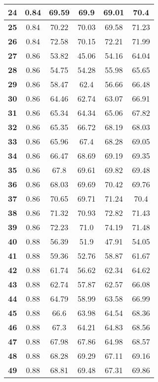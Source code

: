 \begin{longtable}{|c|c|c|c|c|c|}
\textbf{24} & 0.84 & 69.59 & 69.9 & 69.01 & 70.4 \\ \hline 
\textbf{25} & 0.84 & 70.22 & 70.03 & 69.58 & 71.23 \\ \hline 
\textbf{26} & 0.84 & 72.58 & 70.15 & 72.21 & 71.99 \\ \hline 
\textbf{27} & 0.86 & 53.82 & 45.06 & 54.16 & 64.04 \\ \hline 
\textbf{28} & 0.86 & 54.75 & 54.28 & 55.98 & 65.65 \\ \hline 
\textbf{29} & 0.86 & 58.47 & 62.4 & 56.66 & 66.48 \\ \hline 
\textbf{30} & 0.86 & 64.46 & 62.74 & 63.07 & 66.91 \\ \hline 
\textbf{31} & 0.86 & 65.34 & 64.34 & 65.06 & 67.82 \\ \hline 
\textbf{32} & 0.86 & 65.35 & 66.72 & 68.19 & 68.03 \\ \hline 
\textbf{33} & 0.86 & 65.96 & 67.4 & 68.28 & 69.05 \\ \hline 
\textbf{34} & 0.86 & 66.47 & 68.69 & 69.19 & 69.35 \\ \hline 
\textbf{35} & 0.86 & 67.8 & 69.61 & 69.82 & 69.48 \\ \hline 
\textbf{36} & 0.86 & 68.03 & 69.69 & 70.42 & 69.76 \\ \hline 
\textbf{37} & 0.86 & 70.65 & 69.71 & 71.24 & 70.4 \\ \hline 
\textbf{38} & 0.86 & 71.32 & 70.93 & 72.82 & 71.43 \\ \hline 
\textbf{39} & 0.86 & 72.23 & 71.0 & 74.19 & 71.48 \\ \hline 
\textbf{40} & 0.88 & 56.39 & 51.9 & 47.91 & 54.05 \\ \hline 
\textbf{41} & 0.88 & 59.36 & 52.76 & 58.87 & 61.67 \\ \hline 
\textbf{42} & 0.88 & 61.74 & 56.62 & 62.34 & 64.62 \\ \hline 
\textbf{43} & 0.88 & 62.74 & 57.87 & 62.57 & 66.08 \\ \hline 
\textbf{44} & 0.88 & 64.79 & 58.99 & 63.58 & 66.99 \\ \hline 
\textbf{45} & 0.88 & 66.6 & 63.98 & 64.54 & 68.36 \\ \hline 
\textbf{46} & 0.88 & 67.3 & 64.21 & 64.83 & 68.56 \\ \hline 
\textbf{47} & 0.88 & 67.98 & 67.86 & 64.98 & 68.57 \\ \hline 
\textbf{48} & 0.88 & 68.28 & 69.29 & 67.11 & 69.16 \\ \hline 
\textbf{49} & 0.88 & 68.81 & 69.48 & 67.31 & 69.86 \\ \hline 

\end{longtable}
